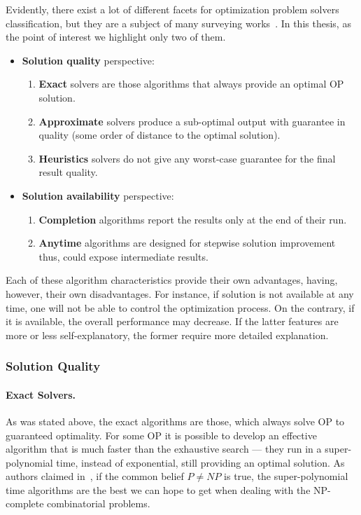Evidently, there exist a lot of different facets for optimization problem solvers classification, but they are a subject of many surveying works~\cite{junger2003combinatorial,biegler2004retrospective,festa2014brief}. In this thesis, as the point of interest we highlight only two of them.

\begin{itemize}
	\item \textbf{Solution quality} perspective:
	\begin{enumerate}
		\item \textbf{Exact} solvers are those algorithms that always provide an optimal OP solution.
		\item \textbf{Approximate} solvers produce a sub-optimal output with guarantee in quality (some order of distance to the optimal solution).
		\item \textbf{Heuristics} solvers do not give any worst-case guarantee for the final result quality.
	\end{enumerate}
	
	\item \textbf{Solution availability} perspective:
	\begin{enumerate}
		\item \textbf{Completion} algorithms report the results only at the end of their run.
		\item \textbf{Anytime} algorithms are designed for stepwise solution improvement thus, could expose intermediate results.
	\end{enumerate}
\end{itemize}

Each of these algorithm characteristics provide their own advantages, having, however, their own disadvantages. For instance, if solution is not available at any time, one will not be able to control the optimization process. On the contrary, if it is available, the overall performance may decrease. 
If the latter features are more or less self-explanatory, the former require more detailed explanation.

\subsubsection{Solution Quality}
\paragraph{Exact Solvers.}
As was stated above, the exact algorithms are those, which always solve OP to guaranteed optimality. For some OP it is possible to develop an effective algorithm that is much faster than the exhaustive search — they run in a super-polynomial time, instead of exponential, still providing an optimal solution. As authors claimed in~\cite{woeginger2003exact}, if the common belief $P \ne NP$ is true, the super-polynomial time algorithms are the best we can hope to get when dealing with the NP-complete combinatorial problems.


